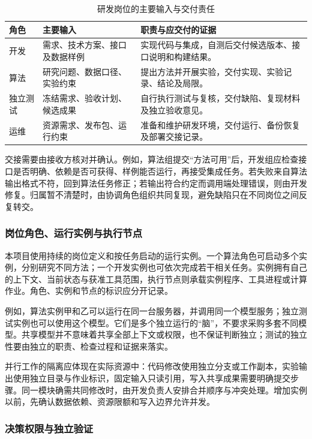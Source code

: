 \documentclass[11pt,a4paper]{article}
\begin{document}
\begin{table}[htbp]
\centering\small\renewcommand{\arraystretch}{1.22}
\begin{tabularx}{\textwidth}{P{1.6cm}P{3.5cm}L}
\toprule
\textbf{角色} & \textbf{主要输入} & \textbf{职责与应交付的证据}\\
\midrule
开发 & 需求、技术方案、接口及数据样例 & 实现代码与集成，自测后交付候选版本、接口说明和构建结果。\\
算法 & 研究问题、数据口径、实验约束 & 提出方法并开展实验，交付实现、实验记录、结论及局限。\\
独立测试 & 冻结需求、验收计划、候选成果 & 自行执行测试与复核，交付缺陷、复现材料及独立验收意见。\\
运维 & 资源需求、发布包、运行约束 & 准备和维护研发环境，交付运行、备份恢复及部署交接记录。\\
\bottomrule
\end{tabularx}
\caption{研发岗位的主要输入与交付责任}
\end{table}

交接需要由接收方核对并确认。例如，算法组提交“方法可用”后，开发组应检查接口是否明确、依赖是否可获得、样例能否运行，再接受集成任务。若失败来自算法输出格式不符，回到算法任务修正；若输出符合约定而调用端处理错误，则由开发修复。归属暂不清楚时，由协调角色组织共同复现，避免缺陷只在不同岗位之间反复转交。

\subsubsection{岗位角色、运行实例与执行节点}

本项目使用持续的岗位定义和按任务启动的运行实例。一个算法角色可启动多个实例，分别研究不同方法；一个开发实例也可依次完成若干相关任务。实例拥有自己的上下文、当前状态与获准工具范围，执行节点则承载实例程序、工具进程或计算作业。角色、实例和节点的标识应分开记录。

例如，算法实例甲和乙可以运行在同一台服务器，并调用同一个模型服务；独立测试实例也可以使用这个模型。它们是多个独立运行的“脑”，不要求采购多套不同模型。共享模型并不意味着共享全部上下文或权限，也不保证判断独立；测试的独立性要由独立的职责、检查过程和证据来落实。

并行工作的隔离应体现在实际资源中：代码修改使用独立分支或工作副本，实验输出使用独立目录与作业标识，固定输入只读引用，写入共享成果需要明确提交步骤。同一模块确需共同修改时，由开发负责人安排合并顺序与冲突处理。增加实例以前，先确认数据依赖、资源限额和写入边界允许并发。

\subsubsection{决策权限与独立验证}
\end{document}
